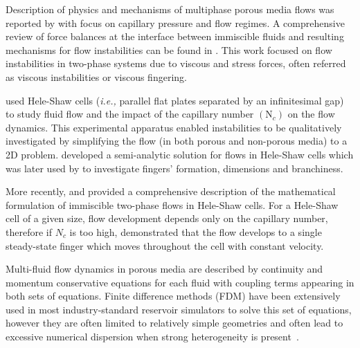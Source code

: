 \documentclass[preprint,authoryear,12pt]{elsarticle}
\newcommand{\eg}{{\it e.g., }}
\newcommand{\ie}{{\it i.e., }}
\begin{document}
Description of physics and mechanisms of multiphase porous media flows was reported by \citet{wooding_1976} with focus on capillary pressure and flow regimes. A comprehensive review of force balances at the interface between immiscible fluids and resulting mechanisms for flow instabilities can be found in \citet{homsy_1987}. %
This work focused on flow instabilities in two-phase systems due to viscous and stress forces, often referred as viscous instabilities or viscous fingering.

\citet{muskat_1934} used Hele-Shaw cells (\ie parallel flat plates separated by an infinitesimal gap) to study fluid flow and the impact of the capillary number $\left(\text{N}_{c}\right)$ on the flow dynamics.
This experimental apparatus enabled instabilities to be qualitatively investigated by simplifying the flow (in both porous and non-porous media) to a 2D problem. \citet{mclean_1981} developed a semi-analytic solution for flows in Hele-Shaw cells which was later used by \citet{guan_2003} to investigate fingers' formation, dimensions and branchiness. 

More recently, \citet{howison_2000} and \citet{praud_2005} provided a comprehensive description of the mathematical formulation of immiscible two-phase flows in Hele-Shaw cells. For a Hele-Shaw cell of a given size, flow development depends only on the capillary number, therefore if \textit{$N_{c}$} is too high, \citet{saffman_1959b} \citep[see also][]{saffman_1959,homsy_1987,tabeling_1987} demonstrated that the flow develops to a single steady-state finger which moves throughout the cell with constant velocity. 

\medskip 
Multi-fluid flow dynamics in porous media are described by continuity and momentum conservative equations for each fluid with coupling terms appearing in both sets of equations. Finite difference methods (FDM) have been extensively used in most industry-standard reservoir simulators to solve this set of equations, however they are often limited to relatively simple geometries and often lead to excessive numerical dispersion when strong heterogeneity is present~\citep{chavent_1986}.
\end{document}
